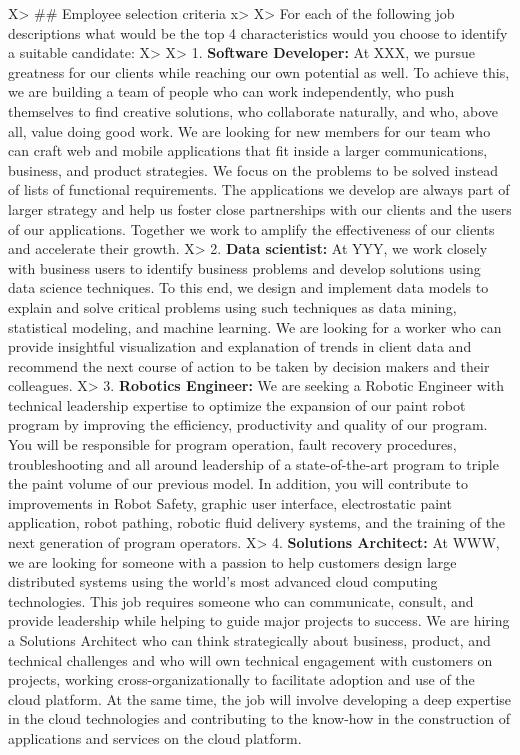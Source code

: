 \documentclass[]{book}
\begin{document}
X\textgreater{} \#\# Employee selection criteria
x\textgreater{}
X\textgreater{} For each of the following job descriptions what would be the top 4 characteristics would you choose to identify a suitable candidate:
X\textgreater{}
X\textgreater{} 1. \textbf{Software Developer:} At XXX, we pursue greatness for our clients while reaching our own potential as well. To achieve this, we are building a team of people who can work independently, who push themselves to find creative solutions, who collaborate naturally, and who, above all, value doing good work. We are looking for new members for our team who can craft web and mobile applications that fit inside a larger communications, business, and product strategies. We focus on the problems to be solved instead of lists of functional requirements. The applications we develop are always part of larger strategy and help us foster close partnerships with our clients and the users of our applications. Together we work to amplify the effectiveness of our clients and accelerate their growth.
X\textgreater{} 2. \textbf{Data scientist:} At YYY, we work closely with business users to identify business problems and develop solutions using data science techniques. To this end, we design and implement data models to explain and solve critical problems using such techniques as data mining, statistical modeling, and machine learning. We are looking for a worker who can provide insightful visualization and explanation of trends in client data and recommend the next course of action to be taken by decision makers and their colleagues.
X\textgreater{} 3. \textbf{Robotics Engineer:} We are seeking a Robotic Engineer with technical leadership expertise to optimize the expansion of our paint robot program by improving the efficiency, productivity and quality of our program. You will be responsible for program operation, fault recovery procedures, troubleshooting and all around leadership of a state-of-the-art program to triple the paint volume of our previous model. In addition, you will contribute to improvements in Robot Safety, graphic user interface, electrostatic paint application, robot pathing, robotic fluid delivery systems, and the training of the next generation of program operators.
X\textgreater{} 4. \textbf{Solutions Architect:} At WWW, we are looking for someone with a passion to help customers design large distributed systems using the world's most advanced cloud computing technologies. This job requires someone who can communicate, consult, and provide leadership while helping to guide major projects to success. We are hiring a Solutions Architect who can think strategically about business, product, and technical challenges and who will own technical engagement with customers on projects, working cross-organizationally to facilitate adoption and use of the cloud platform. At the same time, the job will involve developing a deep expertise in the cloud technologies and contributing to the know-how in the construction of applications and services on the cloud platform.
\end{document}
